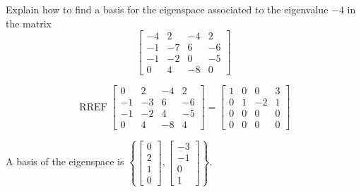
\begin{exerciseStatement}


Explain how to find a basis for the eigenspace associated to the eigenvalue \( -4 \) in the matrix \[ \left[\begin{array}{cccc}
-4 & 2 & -4 & 2 \\
-1 & -7 & 6 & -6 \\
-1 & -2 & 0 & -5 \\
0 & 4 & -8 & 0
\end{array}\right] \]


\end{exerciseStatement}
    
\begin{exerciseAnswer} 


\[\operatorname{RREF} \left[\begin{array}{cccc}
0 & 2 & -4 & 2 \\
-1 & -3 & 6 & -6 \\
-1 & -2 & 4 & -5 \\
0 & 4 & -8 & 4
\end{array}\right] = \left[\begin{array}{cccc}
1 & 0 & 0 & 3 \\
0 & 1 & -2 & 1 \\
0 & 0 & 0 & 0 \\
0 & 0 & 0 & 0
\end{array}\right] \]



A basis of the eigenspace is \( \left\{ \left[\begin{array}{c}
0 \\
2 \\
1 \\
0
\end{array}\right] , \left[\begin{array}{c}
-3 \\
-1 \\
0 \\
1
\end{array}\right] \right\} \).


\end{exerciseAnswer}
    
